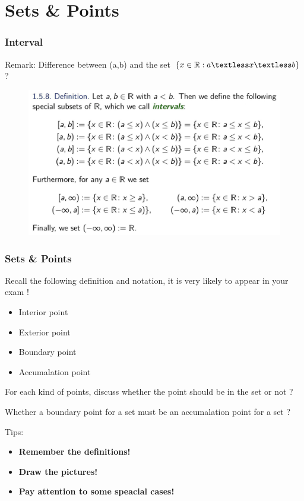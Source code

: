\documentclass{beamer}
\begin{document}
\section{Sets \& Points}
\begin{frame}
    \frametitle{Interval}
    Remark: Difference between (a,b) and the set $\{x\in \mathbb{R}:a\textless x\textless b\}$ ?

    \begin{figure}[htbp]
        \centering
        \includegraphics[width=12cm]{interval.jpg}
    \end{figure}

\end{frame}
\begin{frame}
    \frametitle{Sets \& Points}
    Recall the following definition and notation, it is very likely to appear in your exam !
    \begin{itemize}
        \item Interior point
        \item Exterior point
        \item Boundary point
        \item Accumalation point
    \end{itemize}

    For each kind of points, discuss whether the point should be in the set or not ?

    Whether a boundary point for a set must be an accumalation point for a set ?

    \vspace{0.5em}
    Tips:\\
    \begin{itemize}
        \item \textbf{Remember the definitions!}\\
        \item \textbf{Draw the pictures!}\\
        \item \textbf{Pay attention to some speacial cases!}
    \end{itemize}
\end{frame}
\end{document}
